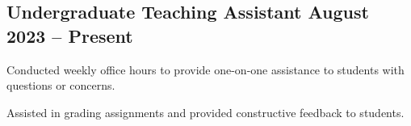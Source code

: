 \documentclass[letter,10pt]{article}
\begin{document}


\subsection{{Undergraduate Teaching Assistant \hfill August 2023 – Present}}
\begin{zitemize}
\item Conducted weekly office hours to provide one-on-one assistance to students with questions or concerns.
\item Assisted in grading assignments and provided constructive feedback to students.

\end{zitemize}
\end{document}
